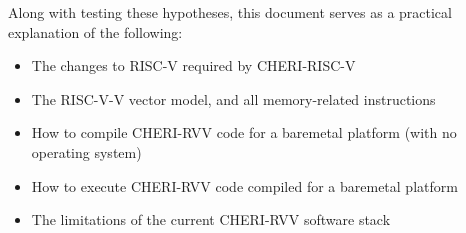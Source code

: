 Along with testing these hypotheses, this document serves as a practical explanation of the following:
\begin{itemize}
    \item The changes to RISC-V required by CHERI-RISC-V
    \item The RISC-V-V vector model, and all memory-related instructions
    \item How to compile CHERI-RVV code for a baremetal platform (with no operating system)
    \item How to execute CHERI-RVV code compiled for a baremetal platform
    \item The limitations of the current CHERI-RVV software stack
\end{itemize}


